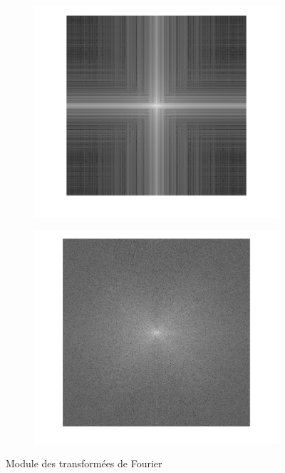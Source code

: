 \documentclass[12pt,a4paper,onecolumn]{article}
\begin{document}
\begin{figure}[H]
\begin{subfigure}[b]{0.4\textwidth}
		\label{fig_11_tf_mod_per}
	\end{subfigure}
	\begin{subfigure}[b]{0.4\textwidth}
		\centering
		\includegraphics[height = 0.25\textheight]{tf_mod_smooth}
		\label{fig_11_tf_mod_smooth}
	\end{subfigure}
	\begin{subfigure}[b]{\textwidth}
		\centering
		\includegraphics[height = 0.25\textheight]{tf_mod_sym}
		\label{fig_11_tf_mod_sym}
	\end{subfigure}
	\caption{Module des transformées de Fourier}
	\label{fig_11_tf_mod}
\end{figure}
\end{document}

